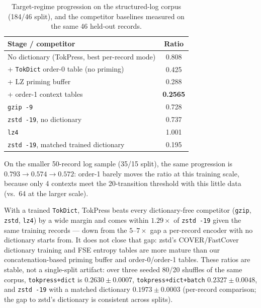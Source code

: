 \documentclass[10pt,twocolumn]{article}
\theoremstyle{plain}
\theoremstyle{definition}
\begin{document}
\begin{table}[h]
\centering\small
\caption{Target-regime progression on the structured-log corpus (184/46 split), and
the competitor baselines measured on the same 46 held-out records.}
\label{tab:progression}
\begin{tabular}{@{}p{5.2cm}c@{}}
\toprule
Stage / competitor & Ratio \\
\midrule
No dictionary (TokPress, best per-record mode) & 0.808 \\
\;+ \texttt{TokDict} order-0 table (no priming) & 0.425 \\
\;+ LZ priming buffer & 0.288 \\
\;+ order-1 context tables & \textbf{0.2565} \\
\midrule
\texttt{gzip -9} & 0.728 \\
\texttt{zstd -19}, no dictionary & 0.737 \\
\texttt{lz4} & 1.001 \\
\texttt{zstd -19}, matched trained dictionary & 0.195 \\
\bottomrule
\end{tabular}
\end{table}

On the smaller 50-record log sample (35/15 split), the same progression is
$0.793 \to 0.574 \to 0.572$: order-1 barely moves the ratio at this training scale,
because only 4 contexts meet the 20-transition threshold with this little data (vs.\
64 at the larger scale).

With a trained \texttt{TokDict}, TokPress beats every dictionary-free competitor
(\texttt{gzip}, \texttt{zstd}, \texttt{lz4}) by a wide margin and comes within
$1.29\times$ of \texttt{zstd -19} given the same training records --- down from the
$5$--$7\times$ gap a per-record encoder with no dictionary starts from. It does not
close that gap: zstd's COVER/FastCover dictionary training and FSE entropy tables are
more mature than our concatenation-based priming buffer and order-0/order-1 tables.
These ratios are stable, not a single-split artifact: over three seeded 80/20
shuffles of the same corpus, \texttt{tokpress+dict} is $0.2630 \pm 0.0007$,
\texttt{tokpress+dict+batch} $0.2327 \pm 0.0048$, and \texttt{zstd -19} with a
matched dictionary $0.1973 \pm 0.0003$ (per-record comparison; the gap to zstd's
dictionary is consistent across splits).
\end{document}
